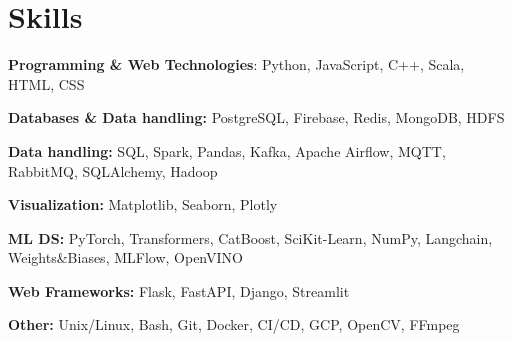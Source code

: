\section{Skills}
\resumeSubHeadingListStart
\item {
            \textbf{Programming \& Web Technologies}: Python, JavaScript, C++, Scala, HTML, CSS
      }
\vspace{-7pt}
\item{
            \textbf{Databases \& Data handling: }{PostgreSQL, Firebase, Redis, MongoDB, HDFS}
      }
\vspace{-7pt}
\item{
            \textbf{Data handling: }{SQL, Spark, Pandas, Kafka, Apache Airflow, MQTT, RabbitMQ, SQLAlchemy, Hadoop}
      }
\vspace{-7pt}
\item{
            \textbf{Visualization: }{Matplotlib, Seaborn, Plotly}
      }
\vspace{-7pt}
\item{
            \textbf{ML \@ DS: }{PyTorch, Transformers, CatBoost, SciKit-Learn, NumPy, Langchain, Weights\&Biases, MLFlow, OpenVINO}
      }
\vspace{-7pt}
\item{
            \textbf{Web Frameworks: }{Flask, FastAPI, Django, Streamlit}
      }
\vspace{-7pt}
\item{
            \textbf{Other: }{Unix/Linux, Bash, Git, Docker, CI/CD, GCP, OpenCV, FFmpeg}
      }
\vspace{-7pt}
\resumeSubHeadingListEnd
